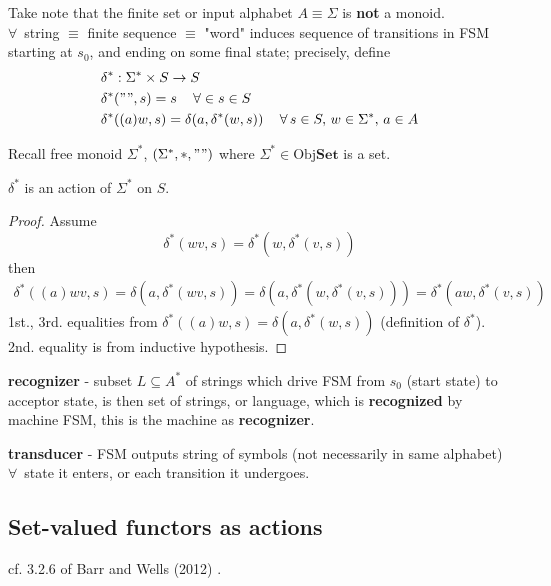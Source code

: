 Take note that the finite set or input alphabet $A \equiv \Sigma$ is \textbf{not} a monoid. \\

$\forall \, $ string $\equiv $ finite sequence $\equiv $ "word" induces sequence of transitions in FSM starting at $s_0$, and ending on some final state; precisely, define
\[
\begin{aligned}
& \delta^* : \Sigma^* \times S \to S \\ 
& \delta^*("", s) = s \quad \, \forall \in s \in S \\ 
& \delta^*((a)w, s) = \delta(a, \delta^*(w,s)) \quad \, \forall \, s \in S, \, w\in \Sigma^*, \, a\in A
\end{aligned}
\]

Recall free monoid $\Sigma^*$, $(\Sigma^*, *, "")$ where $\Sigma^* \in \text{Obj}\mathbf{Set}$ is a set. \\

\begin{proposition}
	$\delta^*$ is an action of $\Sigma^*$ on $S$.
\end{proposition}

\begin{proof}
	Assume
	\[
	\delta^*(wv, s) = \delta^*(w, \delta^*(v,s))
	\]	
	then
	\[
	\begin{gathered}
		\delta^*((a)wv, s) = \delta(a, \delta^*(wv, s)) = \delta(a, \delta^*(w, \delta^*(v,s))) = \delta^*(aw, \delta^*(v,s)) 
	\end{gathered}
	\]
1st., 3rd. equalities from $\delta^*((a)w, s) = \delta(a, \delta^*(w,s))$ (definition of $\delta^*$). \\
2nd. equality is from inductive hypothesis.
\end{proof}

\textbf{recognizer} - subset $L\subseteq A^*$ of strings which drive FSM from $s_0$ (start state) to acceptor state, is then set of strings, or language, which is \textbf{recognized} by machine FSM, this is the machine as \textbf{recognizer}.

\textbf{transducer} - FSM outputs string of symbols (not necessarily in same alphabet) $\forall \, $ state it enters, or each transition it undergoes.

\subsection{Set-valued functors as actions}

cf. 3.2.6 of Barr and Wells (2012) \cite{agat:BaWe2012}. 


